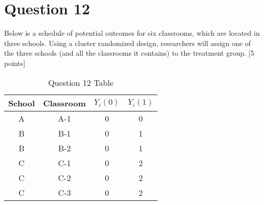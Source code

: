 \documentclass[11pt,notitlepage]{article}\usepackage[]{graphicx}\usepackage[]{color}
\begin{document}
\section*{Question 12}
Below is a schedule of potential outcomes for six classrooms, which are located in three schools.  Using a cluster randomized design, researchers will assign one of the three schools (and all the classrooms it contains) to the treatment group. [5 points]

\begin{table}[H]
  \centering
  \caption{Question 12 Table}
    \begin{tabular}{cccc}
    \toprule
    School & Classroom & $Y_i(0)$ & $Y_i(1)$ \\
    \midrule
    A     & A-1   & 0     & 0 \\
    B     & B-1   & 0     & 1 \\
    B     & B-2   & 0     & 1 \\
    C     & C-1   & 0     & 2 \\
    C     & C-2   & 0     & 2 \\
    C     & C-3   & 0     & 2 \\
    \bottomrule
    \end{tabular}%
  \label{tab:addlabel}%
\end{table}%
\end{document}

